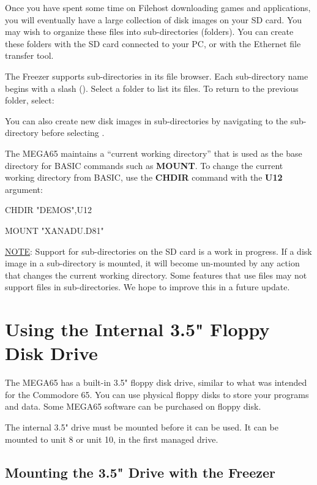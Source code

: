 Once you have spent some time on Filehost downloading games and applications, you will eventually have a large collection of disk images on your SD card. You may wish to organize these files into sub-directories (folders). You can create these folders with the SD card connected to your PC, or with the Ethernet file transfer tool.

The Freezer supports sub-directories in its file browser. Each sub-directory name begins with a slash (\screentext{/}). Select a folder to list its files. To return to the previous folder, select: 

You can also create new disk images in sub-directories by navigating to the sub-directory before selecting .

The MEGA65 maintains a ``current working directory'' that is used as the base directory for BASIC commands such as {\bf MOUNT}. To change the current working directory from BASIC, use the {\bf CHDIR} command with the {\bf U12} argument:

\begin{screencode}
CHDIR "DEMOS",U12

MOUNT "XANADU.D81"
\end{screencode}

\underline{NOTE}: Support for sub-directories on the SD card is a work in progress. If a disk image in a sub-directory is mounted, it will become un-mounted by any action that changes the current working directory. Some features that use files may not support files in sub-directories. We hope to improve this in a future update.


\section{Using the Internal 3.5" Floppy Disk Drive}

The MEGA65 has a built-in 3.5" floppy disk drive, similar to what was intended for the Commodore 65. You can use physical floppy disks to store your programs and data. Some MEGA65 software can be purchased on floppy disk.

The internal 3.5" drive must be mounted before it can be used. It can be mounted to unit 8 or unit 10, in the first managed drive.

\subsection{Mounting the 3.5" Drive with the Freezer}

